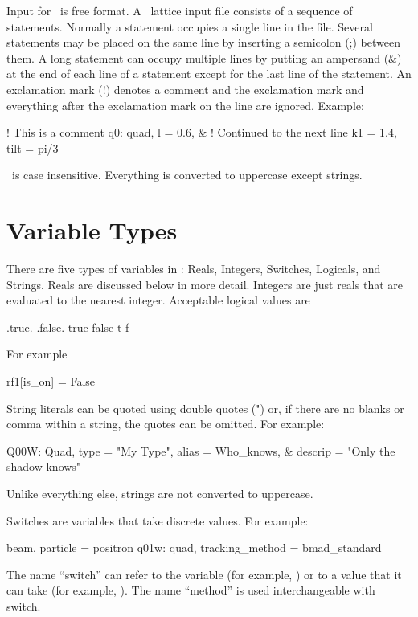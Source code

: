 Input for \bmad\ is free format. A \bmad\ lattice input file consists
of a sequence of statements. Normally a statement occupies a single
line in the file. Several statements may be placed on the same line by
inserting a semicolon (;) between them. A long statement can occupy
multiple lines by putting an ampersand (\&) at the end of each line of
a statement except for the last line of the statement. An
exclamation mark (!) denotes a comment and the exclamation mark and
everything after the exclamation mark on the line are ignored. Example:
\begin{example}
  ! This is a comment
  q0: quad, l = 0.6, &     ! Continued to the next line
            k1 = 1.4, tilt = pi/3
\end{example}
\bmad\ is case insensitive. Everything is converted to uppercase except
strings.

\section{Variable Types}

There are five types of variables in \bmad: Reals, Integers, Switches, 
Logicals, and 
Strings. Reals are discussed below in more detail. Integers are just reals
that are evaluated to the nearest integer. Acceptable logical values are
\begin{example}
  .true.  .false.
   true    false
   t       f
\end{example}
For example
\begin{example}
  rf1[is_on] = False
\end{example}

\vskip0.1in
String literals can be quoted using double quotes (") or, if there are no
blanks or comma within a string, the quotes can be omitted. For example:
\begin{example}
  Q00W: Quad, type = "My Type", alias = Who_knows, &
                                  descrip = "Only the shadow knows"
\end{example}
Unlike everything else, strings are not converted to uppercase.

Switches are variables that take discrete values. For example:
\begin{example}
  beam, particle = positron                    
  q01w: quad, tracking\_method = bmad\_standard 
\end{example}
The name ``switch'' can refer to the variable (for example,
) or to a value that it can take (for example,
). The name ``method'' is used interchangeable with switch.

